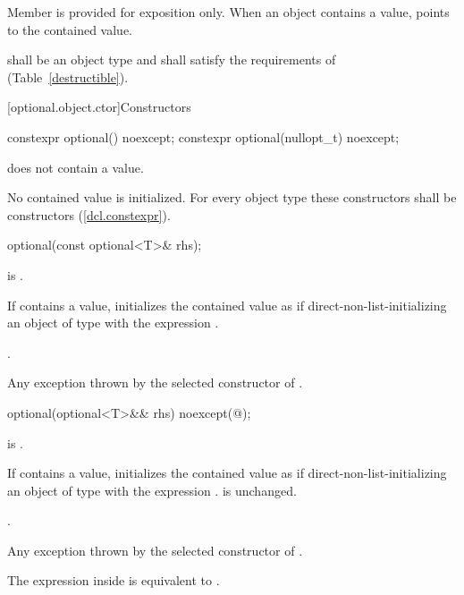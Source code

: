 \pnum
Member  is provided for exposition only. When an  object contains a value,  points to the contained value.

\pnum
{} shall be an object type and shall satisfy the requirements of  (Table~\ref{destructible}).

[optional.object.ctor]{Constructors}

%
\begin{itemdecl}
constexpr optional() noexcept;
constexpr optional(nullopt_t) noexcept;
\end{itemdecl}

\begin{itemdescr}
\pnum
\postcondition
{} does not contain a value.

\pnum
\remarks
No contained value is initialized.
For every object type  these constructors shall be  constructors (\ref{dcl.constexpr}).
\end{itemdescr}

\begin{itemdecl}
optional(const optional<T>& rhs);
\end{itemdecl}

\begin{itemdescr}
\pnum
\requires
{} is .

\pnum
\effects
If  contains a value, initializes the contained value as if
direct-non-list-initializing an object of type  with the expression .

\pnum
\postcondition
{}.

\pnum
\throws
Any exception thrown by the selected constructor of .
\end{itemdescr}

\begin{itemdecl}
optional(optional<T>&& rhs) noexcept(@\seebelow@);
\end{itemdecl}

\begin{itemdescr}
\pnum
\requires
{} is .

\pnum
\effects
If  contains a value, initializes the contained value as if
direct-non-list-initializing an object of type  with the expression .
 is unchanged.

\pnum
\postcondition
{}.

\pnum
\throws
Any exception thrown by the selected constructor of .

\pnum
\remarks
The expression inside  is equivalent to
.
\end{itemdescr}

